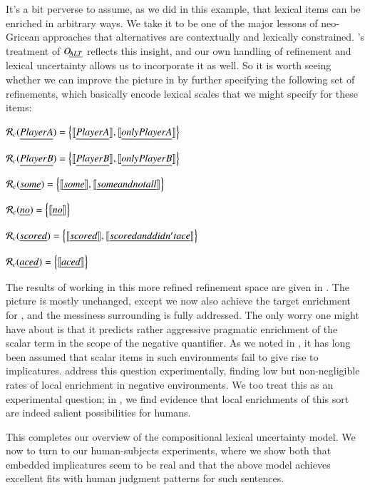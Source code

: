 \documentclass[leqno,12pt]{article}
\begin{document}
It's a bit perverse to assume, as we did in this example, that lexical
items can be enriched in arbitrary ways. We take it to be one of the
major lessons of neo-Gricean approaches that alternatives are
contextually and lexically constrained. \CFS's treatment of $\mathop{O\negthinspace_{\emph{ALT}}}$
reflects this insight, and our own handling of refinement and lexical
uncertainty allows us to incorporate it as well. So it is worth seeing
whether we can improve the picture in  by further
specifying the following set of refinements, which basically
encode lexical scales that we might specify for these items:
%
\begin{examples}
\item\label{neo}
  \begin{examples}
  \item $\mathcal{R}_{c}(\emph{Player A}) = \left\{ \llbracket\emph{Player A}\rrbracket, \llbracket\emph{only Player A}\rrbracket \right\}$
  \item $\mathcal{R}_{c}(\emph{Player B}) = \left\{ \llbracket\emph{Player B}\rrbracket, \llbracket\emph{only Player B}\rrbracket \right\}$
  \item $\mathcal{R}_{c}(\emph{some}) = \left\{ \llbracket\emph{some}\rrbracket, \llbracket\emph{some and not all}\rrbracket \right\}$
  \item $\mathcal{R}_{c}(\emph{no}) = \left\{ \llbracket\emph{no}\rrbracket \right\}$    
  \item $\mathcal{R}_{c}(\emph{scored}) = \left\{ \llbracket\emph{scored}\rrbracket, \llbracket\emph{scored and didn't ace}\rrbracket \right\}$
  \item $\mathcal{R}_{c}(\emph{aced}) = \left\{ \llbracket\emph{aced}\rrbracket \right\}$
  \end{examples}
\end{examples}
%
The results of working in this more refined refinement space are given
in . The picture is mostly unchanged,
except we now also achieve the target enrichment for , and the messiness surrounding  is
fully addressed. The only worry one might have about
 is that it predicts rather aggressive
pragmatic enrichment of the scalar term in the scope of the negative
quantifier. As we noted in , it has long been
assumed that scalar items in such environments fail to give rise to
implicatures. \citet{Chemla:Spector:2011} address this question
experimentally, finding low but non-negligible rates of local
enrichment in negative environments. We too treat this as an
experimental question; in , we find evidence that
local enrichments of this sort are indeed salient possibilities for
humans.

This completes our overview of the compositional lexical uncertainty
model. We now to turn to our human-subjects experiments, where we show
both that embedded implicatures seem to be real and that the above
model achieves excellent fits with human judgment patterns for such
sentences.
\end{document}
